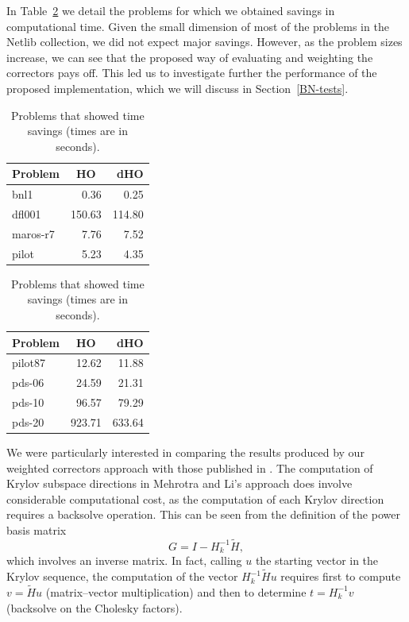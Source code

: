 In Table~\ref{TimeML} we detail the problems for which we obtained savings 
in computational time. Given the small dimension of most of the problems 
in the Netlib collection, we did not expect major savings. However, as the
problem sizes increase, we can see that the proposed way of evaluating and
weighting the correctors pays off. This led us to investigate further 
the performance of the proposed implementation, which we will discuss
in Section~\ref{BN-tests}.
%
\begin{table}[ht]
  \centering
  \begin{minipage}[t]{0.36\textwidth}
    \begin{tabular}{|l|r|r|}\hline
      Problem & \multicolumn{1}{c|}{HO} & dHO \\ \hline
      bnl1    &   0.36 &   0.25 \\
      d{f}l001& 150.63 & 114.80 \\
      maros-r7&   7.76 &   7.52 \\
      pilot   &   5.23 &   4.35 \\ \hline
    \end{tabular}
  \end{minipage}
  \begin{minipage}[t]{0.36\textwidth}
    \begin{tabular}{|l|r|r|}\hline
      Problem & \multicolumn{1}{c|}{HO} & dHO\\ \hline
      pilot87 &  12.62 &  11.88 \\ 
      pds-06  &  24.59 &  21.31 \\
      pds-10  &  96.57 &  79.29 \\
      pds-20  & 923.71 & 633.64 \\ \hline
    \end{tabular}
  \end{minipage}
  \caption{Problems that showed time savings (times are in seconds).}
  \label{TimeML}
\end{table}

We were particularly interested in comparing the results produced by our 
weighted correctors approach with those published in \cite{MehrotraLi}. 
%
The computation of Krylov subspace directions in Mehrotra and Li's 
approach does involve considerable computational cost, as
the computation of each Krylov direction requires a backsolve operation. 
This can be seen from the definition of the power basis matrix
\[
G = I - H_k^{-1}\tilde H,
\]
which involves an inverse matrix. In fact, calling $u$ the starting vector 
in the Krylov sequence, the computation of the vector $ H_k^{-1}\tilde Hu$ 
requires first to compute $v = \tilde Hu$ (matrix--vector multiplication) 
and then to determine $t=H_k^{-1}v$ (backsolve on the Cholesky factors).

